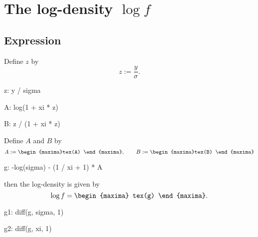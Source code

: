 

\section{The log-density $\log f$}

\subsection{Expression}

Define $z$ by
\begin{equation}
  \label{eq:defz}
  z := \frac{y}{\sigma}.
\end{equation}
\begin{maxima}%
  z: y / sigma
\end{maxima}%
\begin{maxima}%
  A: log(1 + xi * z)
\end{maxima}
\begin{maxima}%
  B: z / (1 + xi * z)
\end{maxima}%

\par\noindent
Define $A$  and $B$ by
\begin{equation}
  \label{eq:defAB}
  A := 
  \begin{maxima}%
    tex(A)
  \end{maxima},%
  \qquad
  B :=
  \begin{maxima}%
    tex(B)
  \end{maxima}%
\end{equation}
\begin{maxima}%
  g: -log(sigma) - (1 / xi + 1) * A 
\end{maxima}%
\par\noindent then the log-density is given by
\[
\log f = 
\begin{maxima}
  tex(g)
\end{maxima}.
\]
\begin{maxima}
  g1: diff(g, sigma, 1)
\end{maxima}%
\begin{maxima}
  g2: diff(g, xi, 1)
\end{maxima}%


